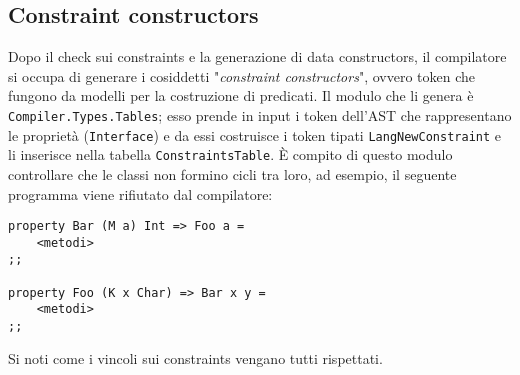 \documentclass[10pt,a4paper]{article}
\begin{document}
\subsection{Constraint constructors}
Dopo il check sui constraints e la generazione di data constructors, il compilatore si occupa di generare i cosiddetti
"\textit{constraint constructors}", ovvero token che fungono da modelli per la costruzione di predicati. Il modulo
che li genera è \texttt{Compiler.Types.Tables}; esso prende in input i token dell'AST che rappresentano le proprietà
(\texttt{Interface}) e da essi costruisce i token tipati \texttt{LangNewConstraint} e li inserisce nella tabella
\texttt{ConstraintsTable}. \`E compito di questo modulo controllare che le classi non formino cicli tra loro, ad
esempio, il seguente programma viene rifiutato dal compilatore:
\begin{lstlisting}
property Bar (M a) Int => Foo a =
    <metodi>
;;

property Foo (K x Char) => Bar x y =
    <metodi>
;;
\end{lstlisting}
Si noti come i vincoli sui constraints vengano tutti rispettati.
\end{document}
